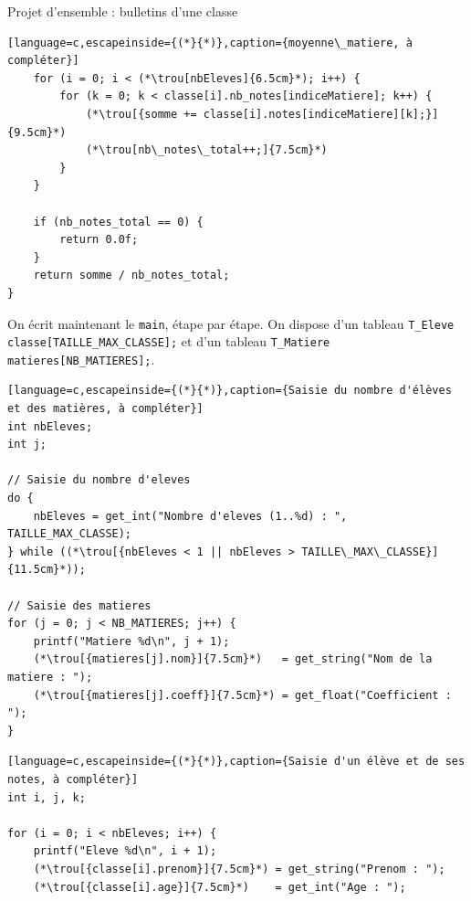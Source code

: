 \begin{UPSTIexercice}{Projet d'ensemble : bulletins d'une classe}
\begin{lstlisting}[language=c,escapeinside={(*}{*)},caption={moyenne\_matiere, à compléter}]
    for (i = 0; i < (*\trou[nbEleves]{6.5cm}*); i++) {
        for (k = 0; k < classe[i].nb_notes[indiceMatiere]; k++) {
            (*\trou[{somme += classe[i].notes[indiceMatiere][k];}]{9.5cm}*)
            (*\trou[nb\_notes\_total++;]{7.5cm}*)
        }
    }

    if (nb_notes_total == 0) {
        return 0.0f;
    }
    return somme / nb_notes_total;
}
\end{lstlisting}

    On écrit maintenant le \texttt{main}, étape par étape. On dispose d'un tableau
    \texttt{T\_Eleve classe[TAILLE\_MAX\_CLASSE];} et d'un tableau \texttt{T\_Matiere matieres[NB\_MATIERES];}.


\begin{lstlisting}[language=c,escapeinside={(*}{*)},caption={Saisie du nombre d'élèves et des matières, à compléter}]
int nbEleves;
int j;

// Saisie du nombre d'eleves
do {
    nbEleves = get_int("Nombre d'eleves (1..%d) : ", TAILLE_MAX_CLASSE);
} while ((*\trou[{nbEleves < 1 || nbEleves > TAILLE\_MAX\_CLASSE}]{11.5cm}*));

// Saisie des matieres
for (j = 0; j < NB_MATIERES; j++) {
    printf("Matiere %d\n", j + 1);
    (*\trou[{matieres[j].nom}]{7.5cm}*)   = get_string("Nom de la matiere : ");
    (*\trou[{matieres[j].coeff}]{7.5cm}*) = get_float("Coefficient : ");
}
\end{lstlisting}



\begin{lstlisting}[language=c,escapeinside={(*}{*)},caption={Saisie d'un élève et de ses notes, à compléter}]
int i, j, k;

for (i = 0; i < nbEleves; i++) {
    printf("Eleve %d\n", i + 1);
    (*\trou[{classe[i].prenom}]{7.5cm}*) = get_string("Prenom : ");
    (*\trou[{classe[i].age}]{7.5cm}*)    = get_int("Age : ");


\end{lstlisting}
\end{UPSTIexercice}
